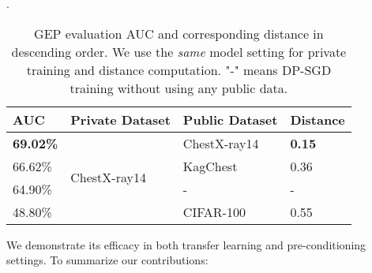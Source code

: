 \documentclass[11pt]{article}
\begin{document}
\begin{table}[!h]
    \caption{GEP evaluation AUC and corresponding distance in descending order. We use the \emph{{same}} model setting for private training and distance computation. "-" means DP-SGD training without using any public data.}.
    \centering
    \begin{tabular}{llll}
        \toprule
        AUC     & Private Dataset               & Public Dataset & Distance \\ \hline
        \textbf{69.02\%} & \multirow{4}{*}{ChestX-ray14} & ChestX-ray14   & \textbf{0.15}     \\ \cline{1-1} \cline{3-4} 
        66.62\% &                               & KagChest       & 0.36     \\ \cline{1-1} \cline{3-4} 
        64.90\% &                               & -              & -        \\ \cline{1-1} \cline{3-4} 
        48.80\% &                               & CIFAR-100      & 0.55     \\
        \bottomrule
    \end{tabular}
\label{eval2}
\end{table}
We demonstrate its efficacy in both transfer learning and pre-conditioning settings.
To summarize our contributions:

\end{document}

